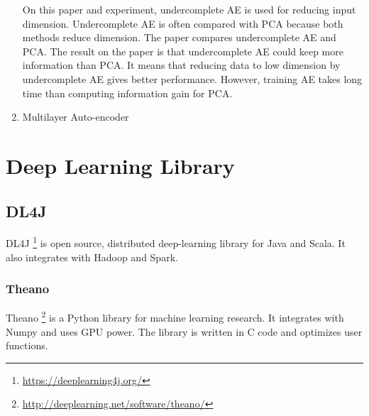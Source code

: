 \documentclass[draft,dvipsnames]{drexel-thesis}
\begin{document}
\begin{thesis}
\begin{enumerate}
On this paper and experiment, undercomplete AE is used for reducing input dimension. Undercomplete AE is often compared with PCA because both methods reduce dimension. The paper \cite{hinton2006reducing} compares undercomplete AE and PCA. The result on the paper is that undercomplete AE could keep more information than PCA. It means that reducing data to low dimension by undercomplete AE gives better performance. However, training AE takes long time than computing information gain for PCA.



\item Multilayer Auto-encoder\\

\end{enumerate}

\section{Deep Learning Library}\label{sec:DLL}
\subsection{DL4J}
DL4J \footnote{\url{https://deeplearning4j.org/}} is open source, distributed deep-learning library for Java and Scala. It also integrates with Hadoop and Spark. 

\subsubsection{Theano}
Theano \footnote{\url{http://deeplearning.net/software/theano/}} is a Python library for machine learning research. It integrates with Numpy and uses GPU power. The library is written in C code and optimizes user functions.


\end{thesis}
\end{document}
